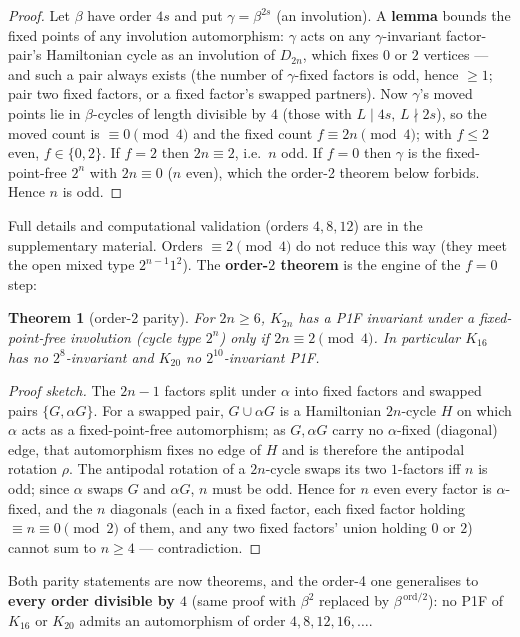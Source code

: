 \documentclass[11pt,reqno]{amsart}
\theoremstyle{plain}
\newtheorem{theorem}{Theorem}
\theoremstyle{definition}
\numberwithin{theorem}{section}
\begin{document}
\begin{proof}
Let $\beta$ have order $4s$ and put $\gamma=\beta^{2s}$ (an involution). A
\textbf{lemma} bounds the fixed points of any involution automorphism: $\gamma$ acts on any
$\gamma$-invariant factor-pair's Hamiltonian cycle as an involution of $D_{2n}$, which
fixes $0$ or $2$ vertices --- and such a pair always exists (the number of $\gamma$-fixed
factors is odd, hence $\ge1$; pair two fixed factors, or a fixed factor's swapped
partners). Now $\gamma$'s moved points lie in $\beta$-cycles of length divisible by $4$
(those with $L\mid4s,\,L\nmid2s$), so the moved count is $\equiv0\pmod4$ and the fixed
count $f\equiv2n\pmod4$; with $f\le2$ even, $f\in\{0,2\}$. If $f=2$ then $2n\equiv2$, i.e.\
$n$ odd. If $f=0$ then $\gamma$ is the fixed-point-free $2^n$ with $2n\equiv0$ ($n$ even),
which the order-2 theorem below forbids. Hence $n$ is odd.
\end{proof}

Full details and computational validation (orders $4,8,12$) are in the supplementary
material. Orders $\equiv2\pmod4$ do not reduce this way (they meet the open
mixed type $2^{n-1}1^2$). The \textbf{order-$2$ theorem} is the engine of the $f=0$ step:

\begin{theorem}[order-2 parity]
For $2n\ge6$, $K_{2n}$ has a P1F invariant under a
fixed-point-free involution (cycle type $2^n$) only if $2n\equiv2\pmod4$. In
particular $K_{16}$ has no $2^8$-invariant and $K_{20}$ no $2^{10}$-invariant P1F.
\end{theorem}

\begin{proof}[Proof sketch]
The $2n-1$ factors split under $\alpha$ into fixed factors and swapped
pairs $\{G,\alpha G\}$. For a swapped pair, $G\cup\alpha G$ is a Hamiltonian $2n$-cycle
$H$ on which $\alpha$ acts as a fixed-point-free automorphism; as $G,\alpha G$ carry no
$\alpha$-fixed (diagonal) edge, that automorphism fixes no edge of $H$ and is therefore
the antipodal rotation $\rho$. The antipodal rotation of a $2n$-cycle swaps its two
$1$-factors iff $n$ is odd; since $\alpha$ swaps $G$ and $\alpha G$, $n$ must be odd.
Hence for $n$ even every factor is $\alpha$-fixed, and the $n$ diagonals (each in a fixed
factor, each fixed factor holding $\equiv n\equiv0\pmod2$ of them, and any two fixed
factors' union holding $0$ or $2$) cannot sum to $n\ge4$ --- contradiction.
\end{proof}

Both parity statements are now theorems, and the order-4 one generalises to \textbf{every
order divisible by $4$} (same proof with $\beta^2$ replaced by $\beta^{\,\mathrm{ord}/2}$):
no P1F of $K_{16}$ or $K_{20}$ admits an automorphism of order $4,8,12,16,\dots$.
\end{document}
